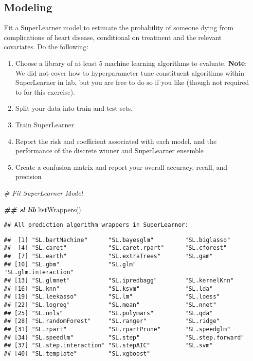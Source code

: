 \documentclass[
]{article}
\newenvironment{Shaded}{\begin{snugshade}}{\end{snugshade}}
\newcommand{\CommentTok}[1]{\textcolor[rgb]{0.56,0.35,0.01}{\textit{#1}}}
\newcommand{\DocumentationTok}[1]{\textcolor[rgb]{0.56,0.35,0.01}{\textbf{\textit{#1}}}}
\newcommand{\FunctionTok}[1]{\textcolor[rgb]{0.00,0.00,0.00}{#1}}
\newcommand{\NormalTok}[1]{#1}
\begin{document}
\hypertarget{modeling}{%
\subsection{Modeling}\label{modeling}}

Fit a SuperLearner model to estimate the probability of someone dying
from complications of heart disease, conditional on treatment and the
relevant covariates. Do the following:

\begin{enumerate}
    \item Choose a library of at least 5 machine learning algorithms to evaluate. \textbf{Note}: We did not cover how to hyperparameter tune constituent algorithms within SuperLearner in lab, but you are free to do so if you like (though not required to for this exercise). 
    \item Split your data into train and test sets.
    \item Train SuperLearner
    \item Report the risk and coefficient associated with each model, and the performance of the discrete winner and SuperLearner ensemble
    \item Create a confusion matrix and report your overall accuracy, recall, and precision
\end{enumerate}

\begin{Shaded}
\begin{Highlighting}[]
\CommentTok{\# Fit SuperLearner Model}

\DocumentationTok{\#\# sl lib}
\FunctionTok{listWrappers}\NormalTok{()}
\end{Highlighting}
\end{Shaded}

\begin{verbatim}
## All prediction algorithm wrappers in SuperLearner:
\end{verbatim}

\begin{verbatim}
##  [1] "SL.bartMachine"      "SL.bayesglm"         "SL.biglasso"        
##  [4] "SL.caret"            "SL.caret.rpart"      "SL.cforest"         
##  [7] "SL.earth"            "SL.extraTrees"       "SL.gam"             
## [10] "SL.gbm"              "SL.glm"              "SL.glm.interaction" 
## [13] "SL.glmnet"           "SL.ipredbagg"        "SL.kernelKnn"       
## [16] "SL.knn"              "SL.ksvm"             "SL.lda"             
## [19] "SL.leekasso"         "SL.lm"               "SL.loess"           
## [22] "SL.logreg"           "SL.mean"             "SL.nnet"            
## [25] "SL.nnls"             "SL.polymars"         "SL.qda"             
## [28] "SL.randomForest"     "SL.ranger"           "SL.ridge"           
## [31] "SL.rpart"            "SL.rpartPrune"       "SL.speedglm"        
## [34] "SL.speedlm"          "SL.step"             "SL.step.forward"    
## [37] "SL.step.interaction" "SL.stepAIC"          "SL.svm"             
## [40] "SL.template"         "SL.xgboost"
\end{verbatim}
\end{document}
